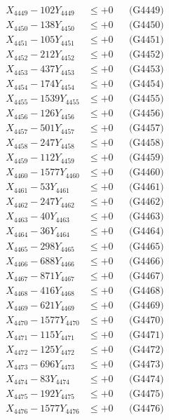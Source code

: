 \documentclass[a4paper,10pt]{article}
\begin{document}
{\begin{align}
X_{4449} - 102Y_{4449} &\leq +0 && \text{(G4449)} \\
X_{4450} - 138Y_{4450} &\leq +0 && \text{(G4450)} \\
\allowbreak
X_{4451} - 105Y_{4451} &\leq +0 && \text{(G4451)} \\
X_{4452} - 212Y_{4452} &\leq +0 && \text{(G4452)} \\
X_{4453} - 437Y_{4453} &\leq +0 && \text{(G4453)} \\
X_{4454} - 174Y_{4454} &\leq +0 && \text{(G4454)} \\
X_{4455} - 1539Y_{4455} &\leq +0 && \text{(G4455)} \\
X_{4456} - 126Y_{4456} &\leq +0 && \text{(G4456)} \\
X_{4457} - 501Y_{4457} &\leq +0 && \text{(G4457)} \\
X_{4458} - 247Y_{4458} &\leq +0 && \text{(G4458)} \\
X_{4459} - 112Y_{4459} &\leq +0 && \text{(G4459)} \\
X_{4460} - 1577Y_{4460} &\leq +0 && \text{(G4460)} \\
\allowbreak
X_{4461} - 53Y_{4461} &\leq +0 && \text{(G4461)} \\
X_{4462} - 247Y_{4462} &\leq +0 && \text{(G4462)} \\
X_{4463} - 40Y_{4463} &\leq +0 && \text{(G4463)} \\
X_{4464} - 36Y_{4464} &\leq +0 && \text{(G4464)} \\
X_{4465} - 298Y_{4465} &\leq +0 && \text{(G4465)} \\
X_{4466} - 688Y_{4466} &\leq +0 && \text{(G4466)} \\
X_{4467} - 871Y_{4467} &\leq +0 && \text{(G4467)} \\
X_{4468} - 416Y_{4468} &\leq +0 && \text{(G4468)} \\
X_{4469} - 621Y_{4469} &\leq +0 && \text{(G4469)} \\
X_{4470} - 1577Y_{4470} &\leq +0 && \text{(G4470)} \\
\allowbreak
X_{4471} - 115Y_{4471} &\leq +0 && \text{(G4471)} \\
X_{4472} - 125Y_{4472} &\leq +0 && \text{(G4472)} \\
X_{4473} - 696Y_{4473} &\leq +0 && \text{(G4473)} \\
X_{4474} - 83Y_{4474} &\leq +0 && \text{(G4474)} \\
X_{4475} - 192Y_{4475} &\leq +0 && \text{(G4475)} \\
X_{4476} - 1577Y_{4476} &\leq +0 && \text{(G4476)} \\

\end{align}}
\end{document}

